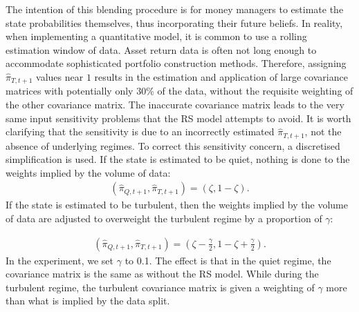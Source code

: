 \documentclass[a4paper,11pt,nocenter,bold,noupper,headcount]{mythesis}
\theoremstyle{plain}
\theoremstyle{definition}
\begin{document}
The intention of this blending procedure is for money managers to estimate the state probabilities themselves, thus incorporating their future beliefs. In reality, when implementing a quantitative model, it is common to use a rolling estimation window of data. Asset return data is often not long enough to accommodate sophisticated portfolio construction methods. Therefore, assigning $\hat{\pi}_{T, t + 1}$ values near $1$ results in the estimation and application of large covariance matrices with potentially only $30 \%$ of the data, without the requisite weighting of the other covariance matrix. The inaccurate covariance matrix leads to the very same input sensitivity problems that the RS model attempts to avoid. It is worth clarifying that the sensitivity is due to an incorrectly estimated $\hat{\pi}_{T, t + 1}$, not the absence of underlying regimes. To correct this sensitivity concern, a discretised simplification is used. If the state is estimated to be quiet, nothing is done to the weights implied by the volume of data:
\begin{align*}
(\hat{\pi}_{Q, t + 1}, \hat{\pi}_{T, t + 1}) = (\zeta, 1 - \zeta).
\end{align*}
If the state is estimated to be turbulent, then the weights implied by the volume of data are adjusted to overweight the turbulent regime by a proportion of $\gamma$:

\begin{align*}
(\hat{\pi}_{Q, t + 1}, \hat{\pi}_{T, t + 1}) = (\zeta -  \frac{\gamma}{2}, 1 - \zeta + \frac{\gamma}{2}).
\end{align*}
In the experiment, we set $\gamma$ to 0.1. The effect is that in the quiet regime, the covariance matrix is the same as without the RS model. While during the turbulent regime, the turbulent covariance matrix is given a weighting of $\gamma$ more than what is implied by the data split.
\end{document}
